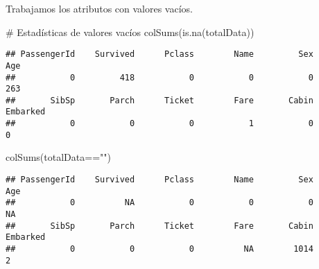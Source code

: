 \documentclass[]{article}
\newenvironment{Shaded}{\begin{snugshade}}{\end{snugshade}}
\newcommand{\CommentTok}[1]{\textcolor[rgb]{0.50,0.62,0.50}{#1}}
\newcommand{\DataTypeTok}[1]{\textcolor[rgb]{0.87,0.87,0.75}{#1}}
\newcommand{\KeywordTok}[1]{\textcolor[rgb]{0.94,0.87,0.69}{#1}}
\newcommand{\NormalTok}[1]{\textcolor[rgb]{0.80,0.80,0.80}{#1}}
\newcommand{\OperatorTok}[1]{\textcolor[rgb]{0.94,0.94,0.82}{#1}}
\newcommand{\StringTok}[1]{\textcolor[rgb]{0.80,0.58,0.58}{#1}}
\begin{document}
Trabajamos los atributos con valores vacíos.

\begin{Shaded}
\begin{Highlighting}[]
\CommentTok{\# Estadísticas de valores vacíos}
\KeywordTok{colSums}\NormalTok{(}\KeywordTok{is.na}\NormalTok{(totalData))}
\end{Highlighting}
\end{Shaded}

\begin{verbatim}
## PassengerId    Survived      Pclass        Name         Sex         Age 
##           0         418           0           0           0         263 
##       SibSp       Parch      Ticket        Fare       Cabin    Embarked 
##           0           0           0           1           0           0
\end{verbatim}

\begin{Shaded}
\begin{Highlighting}[]
\KeywordTok{colSums}\NormalTok{(totalData}\OperatorTok{==}\StringTok{""}\NormalTok{)}
\end{Highlighting}
\end{Shaded}

\begin{verbatim}
## PassengerId    Survived      Pclass        Name         Sex         Age 
##           0          NA           0           0           0          NA 
##       SibSp       Parch      Ticket        Fare       Cabin    Embarked 
##           0           0           0          NA        1014           2
\end{verbatim}

\begin{Shaded}
\end{Shaded}
\end{document}
